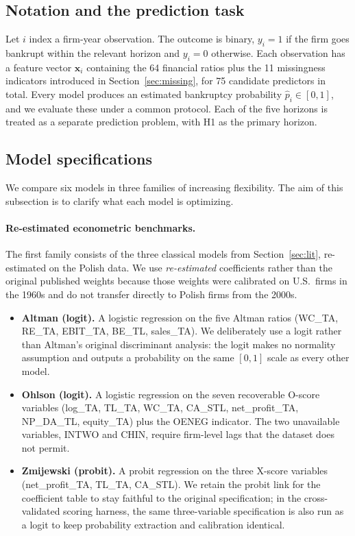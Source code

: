 \documentclass[12pt,a4paper]{article}
\begin{document}
\subsection{Notation and the prediction task}

Let $i$ index a firm-year observation. The outcome is binary, $y_i = 1$ if
the firm goes bankrupt within the relevant horizon and $y_i = 0$ otherwise.
Each observation has a feature vector $\mathbf{x}_i$ containing the 64
financial ratios plus the 11 missingness indicators introduced in
Section~\ref{sec:missing}, for 75 candidate predictors in total. Every model produces an estimated bankruptcy probability
$\hat{p}_i \in [0, 1]$, and we evaluate these under a common protocol.
Each of the five horizons is treated as a separate prediction problem,
with H1 as the primary horizon.

\subsection{Model specifications}

We compare six models in three families of increasing flexibility. The
aim of this subsection is to clarify what each model is optimizing.

\paragraph{Re-estimated econometric benchmarks.} The first family consists of
the three classical models from Section~\ref{sec:lit}, re-estimated on the
Polish data. We use \emph{re-estimated} coefficients rather than the original published
weights because those weights were calibrated on U.S.\ firms in the 1960s
and do not transfer directly to Polish firms from the 2000s.

\begin{itemize}
\item \textbf{Altman (logit).} A logistic regression on the five Altman ratios
(WC\_TA, RE\_TA, EBIT\_TA, BE\_TL, sales\_TA). We deliberately use a logit
rather than Altman's original discriminant analysis: the logit makes no
normality assumption and outputs a probability on the same $[0,1]$ scale as
every other model.

\item \textbf{Ohlson (logit).} A logistic regression on the seven recoverable
O-score variables (log\_TA, TL\_TA, WC\_TA, CA\_STL, net\_profit\_TA,
NP\_DA\_TL, equity\_TA) plus the OENEG indicator. The two unavailable
variables, INTWO and CHIN, require firm-level lags that the dataset does not
permit.

\item \textbf{Zmijewski (probit).} A probit regression on the three X-score
variables (net\_profit\_TA, TL\_TA, CA\_STL). We retain the probit link for
the coefficient table to stay faithful to the original specification; in the
cross-validated scoring harness, the same three-variable specification is also
run as a logit to keep probability extraction and calibration identical.
\end{itemize}
\end{document}
